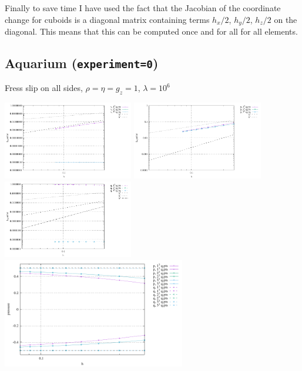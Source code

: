 Finally to save time I have used the fact that the Jacobian of the 
coordinate change for cuboids is a diagonal matrix containing terms $h_x/2$,
$h_y/2$, $h_z/2$ on the diagonal. This means that this can be computed once
and for all for all elements. 

\subsection*{Aquarium ({\tt experiment=0})}

Fress slip on all sides, $\rho=\eta=g_z=1$, $\lambda=10^6$

\begin{center}
\includegraphics[width=5.7cm]{python_codes/fieldstone_10/resultsQ2/exp0/errv}
\includegraphics[width=5.7cm]{python_codes/fieldstone_10/resultsQ2/exp0/errp}
\includegraphics[width=5.7cm]{python_codes/fieldstone_10/resultsQ2/exp0/errq}\\
\includegraphics[width=8cm]{python_codes/fieldstone_10/resultsQ2/exp0/p_stats}
\end{center}

